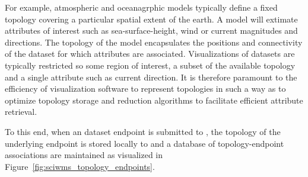 For example, atmospheric and oceanagrphic models typically define a
fixed topology covering a particular spatial extent of the earth. A
model will extimate attributes of interest such as sea-surface-height,
wind or current magnitudes and directions. The topology of the model
encapsulates the positions and connectivity of the dataset for which
attributes are associated. Visualizations of datasets are typically
restricted so some region of interest, a subset of the available
topology and a single attribute such as current direction. It is
therefore paramount to the efficiency of visualization software to
represent topologies in such a way as to optimize topology storage and
reduction algorithms to facilitate efficient attribute retrieval.

To this end, when an dataset endpoint is submitted to \sciwms{}, the
topology of the underlying endpoint is stored locally to \sciwms{} and
a database of topology-endpoint associations are maintained as
visualized in Figure~\ref{fig:sciwms_topology_endpoints}. 



